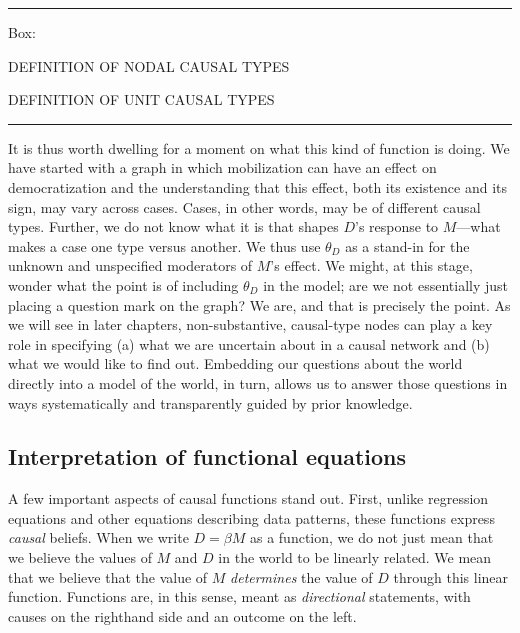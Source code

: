 \documentclass[12pt,]{book}
\begin{document}
\begin{center}\rule{0.5\linewidth}{\linethickness}\end{center}

Box:

DEFINITION OF NODAL CAUSAL TYPES

DEFINITION OF UNIT CAUSAL TYPES

\begin{center}\rule{0.5\linewidth}{\linethickness}\end{center}

It is thus worth dwelling for a moment on what this kind of function is doing. We have started with a graph in which mobilization can have an effect on democratization and the understanding that this effect, both its existence and its sign, may vary across cases. Cases, in other words, may be of different causal types. Further, we do not know what it is that shapes \(D\)'s response to \(M\)---what makes a case one type versus another. We thus use \(\theta_D\) as a stand-in for the unknown and unspecified moderators of \(M\)'s effect. We might, at this stage, wonder what the point is of including \(\theta_D\) in the model; are we not essentially just placing a question mark on the graph? We are, and that is precisely the point. As we will see in later chapters, non-substantive, causal-type nodes can play a key role in specifying (a) what we are uncertain about in a causal network and (b) what we would like to find out. Embedding our questions about the world directly into a model of the world, in turn, allows us to answer those questions in ways systematically and transparently guided by prior knowledge.

\hypertarget{interpretation-of-functional-equations}{%
\subsection{Interpretation of functional equations}\label{interpretation-of-functional-equations}}

A few important aspects of causal functions stand out. First, unlike regression equations and other equations describing data patterns, these functions express \emph{causal} beliefs. When we write \(D=\beta M\) as a function, we do not just mean that we believe the values of \(M\) and \(D\) in the world to be linearly related. We mean that we believe that the value of \(M\) \emph{determines} the value of \(D\) through this linear function. Functions are, in this sense, meant as \emph{directional} statements, with causes on the righthand side and an outcome on the left.
\end{document}
